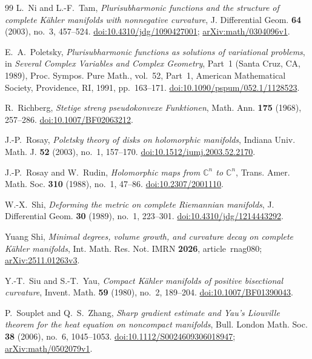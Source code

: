 \begin{thebibliography}{99}
L.~Ni and L.-F.~Tam,
\emph{Plurisubharmonic functions and the structure of complete
K\"ahler manifolds with nonnegative curvature},
J. Differential Geom. \textbf{64} (2003), no.~3, 457--524.
\href{https://doi.org/10.4310/jdg/1090427001}
{doi:10.4310/jdg/1090427001};
\href{https://arxiv.org/abs/math/0304096v1}{arXiv:math/0304096v1}.

E.~A.~Poletsky,
\emph{Plurisubharmonic functions as solutions of variational problems},
in \emph{Several Complex Variables and Complex Geometry}, Part~1
(Santa Cruz, CA, 1989),
Proc. Sympos. Pure Math., vol.~52, Part~1,
American Mathematical Society, Providence, RI, 1991, pp.~163--171.
\href{https://doi.org/10.1090/pspum/052.1/1128523}
{doi:10.1090/pspum/052.1/1128523}.

R.~Richberg,
\emph{Stetige streng pseudokonvexe Funktionen},
Math. Ann. \textbf{175} (1968), 257--286.
\href{https://doi.org/10.1007/BF02063212}{doi:10.1007/BF02063212}.

J.-P.~Rosay,
\emph{Poletsky theory of disks on holomorphic manifolds},
Indiana Univ. Math. J. \textbf{52} (2003), no.~1, 157--170.
\href{https://doi.org/10.1512/iumj.2003.52.2170}
{doi:10.1512/iumj.2003.52.2170}.

J.-P.~Rosay and W.~Rudin,
\emph{Holomorphic maps from $\mathbb C^n$ to $\mathbb C^n$},
Trans. Amer. Math. Soc. \textbf{310} (1988), no.~1, 47--86.
\href{https://doi.org/10.2307/2001110}{doi:10.2307/2001110}.

W.-X.~Shi,
\emph{Deforming the metric on complete Riemannian manifolds},
J. Differential Geom. \textbf{30} (1989), no.~1, 223--301.
\href{https://doi.org/10.4310/jdg/1214443292}
{doi:10.4310/jdg/1214443292}.

Yuang Shi,
\emph{Minimal degrees, volume growth, and curvature decay on complete
K\"ahler manifolds},
Int. Math. Res. Not. IMRN \textbf{2026}, article~rnag080;
\href{https://arxiv.org/abs/2511.01263v3}{arXiv:2511.01263v3}.

Y.-T.~Siu and S.-T.~Yau,
\emph{Compact K\"ahler manifolds of positive bisectional curvature},
Invent. Math. \textbf{59} (1980), no.~2, 189--204.
\href{https://doi.org/10.1007/BF01390043}{doi:10.1007/BF01390043}.

P.~Souplet and Q.~S.~Zhang,
\emph{Sharp gradient estimate and Yau's Liouville theorem for the heat
equation on noncompact manifolds},
Bull. London Math. Soc. \textbf{38} (2006), no.~6, 1045--1053.
\href{https://doi.org/10.1112/S0024609306018947}
{doi:10.1112/S0024609306018947};
\href{https://arxiv.org/abs/math/0502079v1}{arXiv:math/0502079v1}.


\end{thebibliography}
